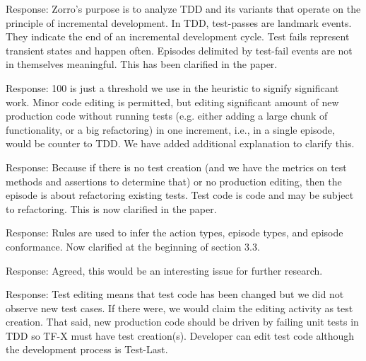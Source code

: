 \documentclass[11pt]{article}
\begin{document}
\noindent Response: Zorro's purpose is to analyze TDD and its variants that
operate on the principle of incremental development. In TDD, test-passes
are landmark events. They indicate the end of an incremental development
cycle. Test fails represent transient states and happen often. Episodes
delimited by test-fail events are not in themselves meaningful.  This has been clarified in the paper.


\noindent Response: 100 is just a threshold we use in the heuristic to
signify significant work. Minor code editing is permitted, but editing
significant amount of new production code without running tests
(e.g. either adding a large chunk of functionality, or a big refactoring)
in one increment, i.e., in a single episode, would be counter to TDD.  We have 
added additional explanation to clarify this.


\noindent Response: Because if there is no test creation (and we have the
metrics on test methods and assertions to determine that) or no production
editing, then the episode is about refactoring existing tests. Test code is
code and may be subject to refactoring. This is now clarified in the paper.


\noindent Response: Rules are used to infer the action types, episode types, and episode conformance. Now clarified at the beginning of section 3.3.


\noindent Response: Agreed, this would be an interesting issue for further research.


\noindent Response: Test editing means that test code has been changed but
we did not observe new test cases. If there were, we would claim the
editing activity as test creation.  That said, new production code should
be driven by failing unit tests in TDD so TF-X must have test
creation(s). Developer can edit test code although the development process
is Test-Last.
\end{document}
